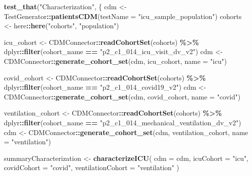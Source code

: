 \documentclass[
]{article}
\newenvironment{Shaded}{\begin{snugshade}}{\end{snugshade}}
\newcommand{\AttributeTok}[1]{\textcolor[rgb]{0.13,0.29,0.53}{#1}}
\newcommand{\FunctionTok}[1]{\textcolor[rgb]{0.13,0.29,0.53}{\textbf{#1}}}
\newcommand{\NormalTok}[1]{#1}
\newcommand{\OtherTok}[1]{\textcolor[rgb]{0.56,0.35,0.01}{#1}}
\newcommand{\SpecialCharTok}[1]{\textcolor[rgb]{0.81,0.36,0.00}{\textbf{#1}}}
\newcommand{\StringTok}[1]{\textcolor[rgb]{0.31,0.60,0.02}{#1}}
\begin{document}
\begin{Shaded}
\begin{Highlighting}[]
\FunctionTok{test\_that}\NormalTok{(}\StringTok{"Characterization"}\NormalTok{, \{}
\NormalTok{  cdm }\OtherTok{\textless{}{-}}\NormalTok{ TestGenerator}\SpecialCharTok{::}\FunctionTok{patientsCDM}\NormalTok{(}\AttributeTok{testName =} \StringTok{"icu\_sample\_population"}\NormalTok{)}
\NormalTok{  cohorts }\OtherTok{\textless{}{-}}\NormalTok{ here}\SpecialCharTok{::}\FunctionTok{here}\NormalTok{(}\StringTok{"cohorts"}\NormalTok{, }\StringTok{"population"}\NormalTok{)}
  
\NormalTok{  icu\_cohort }\OtherTok{\textless{}{-}}\NormalTok{ CDMConnector}\SpecialCharTok{::}\FunctionTok{readCohortSet}\NormalTok{(cohorts) }\SpecialCharTok{\%\textgreater{}\%}
\NormalTok{    dplyr}\SpecialCharTok{::}\FunctionTok{filter}\NormalTok{(cohort\_name }\SpecialCharTok{==} \StringTok{"p2\_c1\_014\_icu\_visit\_dv\_v2"}\NormalTok{)}
\NormalTok{  cdm }\OtherTok{\textless{}{-}}\NormalTok{ CDMConnector}\SpecialCharTok{::}\FunctionTok{generate\_cohort\_set}\NormalTok{(cdm, icu\_cohort, }\AttributeTok{name =} \StringTok{"icu"}\NormalTok{)}
  
\NormalTok{  covid\_cohort }\OtherTok{\textless{}{-}}\NormalTok{ CDMConnector}\SpecialCharTok{::}\FunctionTok{readCohortSet}\NormalTok{(cohorts) }\SpecialCharTok{\%\textgreater{}\%}
\NormalTok{    dplyr}\SpecialCharTok{::}\FunctionTok{filter}\NormalTok{(cohort\_name }\SpecialCharTok{==} \StringTok{"p2\_c1\_014\_covid19\_v2"}\NormalTok{)}
\NormalTok{  cdm }\OtherTok{\textless{}{-}}\NormalTok{ CDMConnector}\SpecialCharTok{::}\FunctionTok{generate\_cohort\_set}\NormalTok{(cdm, covid\_cohort, }\AttributeTok{name =} \StringTok{"covid"}\NormalTok{)}
  
\NormalTok{  ventilation\_cohort }\OtherTok{\textless{}{-}}\NormalTok{ CDMConnector}\SpecialCharTok{::}\FunctionTok{readCohortSet}\NormalTok{(cohorts) }\SpecialCharTok{\%\textgreater{}\%}
\NormalTok{    dplyr}\SpecialCharTok{::}\FunctionTok{filter}\NormalTok{(cohort\_name }\SpecialCharTok{==} \StringTok{"p2\_c1\_014\_mechanical\_ventilation\_dv\_v2"}\NormalTok{)}
\NormalTok{  cdm }\OtherTok{\textless{}{-}}\NormalTok{ CDMConnector}\SpecialCharTok{::}\FunctionTok{generate\_cohort\_set}\NormalTok{(cdm, ventilation\_cohort, }\AttributeTok{name =} \StringTok{"ventilation"}\NormalTok{)}
  
\NormalTok{  summaryCharacterization }\OtherTok{\textless{}{-}} \FunctionTok{characterizeICU}\NormalTok{(}
    \AttributeTok{cdm =}\NormalTok{ cdm,}
    \AttributeTok{icuCohort =} \StringTok{"icu"}\NormalTok{,}
    \AttributeTok{covidCohort =} \StringTok{"covid"}\NormalTok{,}
    \AttributeTok{ventilationCohort =} \StringTok{"ventilation"}
\NormalTok{  )}
  

\end{Highlighting}
\end{Shaded}
\end{document}
